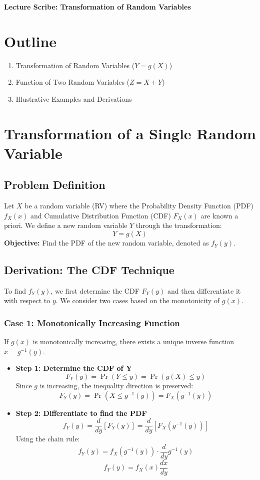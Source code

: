 \documentclass[12pt]{article}
\begin{document}
\begin{center}
    \textbf{\Large Lecture Scribe: Transformation of Random Variables}
\end{center}

\section*{Outline}
\begin{enumerate}
    \item Transformation of Random Variables ($Y = g(X)$)
    \item Function of Two Random Variables ($Z = X + Y$)
    \item Illustrative Examples and Derivations
\end{enumerate}

\section{Transformation of a Single Random Variable}
\subsection*{Problem Definition}
Let $X$ be a random variable (RV) where the Probability Density Function (PDF) $f_X(x)$ and Cumulative Distribution Function (CDF) $F_X(x)$ are known a priori.
We define a new random variable $Y$ through the transformation:
$$ Y = g(X) $$
\textbf{Objective:} Find the PDF of the new random variable, denoted as $f_Y(y)$.

\subsection*{Derivation: The CDF Technique}
To find $f_Y(y)$, we first determine the CDF $F_Y(y)$ and then differentiate it with respect to $y$. We consider two cases based on the monotonicity of $g(x)$.

\subsubsection*{Case 1: Monotonically Increasing Function}
If $g(x)$ is monotonically increasing, there exists a unique inverse function $x = g^{-1}(y)$.
\begin{itemize}
    \item \textbf{Step 1: Determine the CDF of Y}
    $$ F_Y(y) = \Pr(Y \le y) = \Pr(g(X) \le y) $$
    Since $g$ is increasing, the inequality direction is preserved:
    $$ F_Y(y) = \Pr(X \le g^{-1}(y)) = F_X(g^{-1}(y)) $$
    
    \item \textbf{Step 2: Differentiate to find the PDF}
    $$ f_Y(y) = \frac{d}{dy} [F_Y(y)] = \frac{d}{dy} [F_X(g^{-1}(y))] $$
    Using the chain rule:
    $$ f_Y(y) = f_X(g^{-1}(y)) \cdot \frac{d}{dy} g^{-1}(y) $$
    $$ f_Y(y) = f_X(x) \frac{dx}{dy} $$
\end{itemize}
\end{document}
